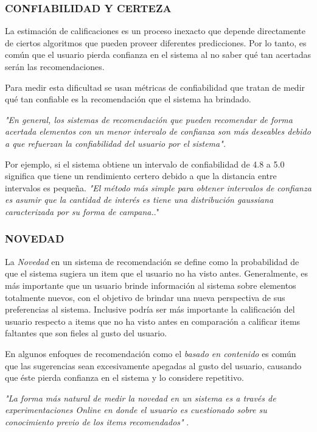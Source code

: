     \subsubsection{CONFIABILIDAD Y CERTEZA }

    La estimación de calificaciones es un proceso inexacto que depende directamente de ciertos algoritmos que pueden proveer diferentes predicciones. Por lo tanto, es común que el usuario pierda confianza en el sistema al no saber qué tan acertadas serán las recomendaciones.

    Para medir esta dificultad se usan métricas de confiabilidad que tratan de medir qué tan confiable es la recomendación que el sistema ha brindado.

    \textit{"En general, los sistemas de recomendación que pueden recomendar de forma acertada elementos con un menor intervalo de confianza son más deseables debido a que refuerzan la confiabilidad del usuario por el sistema".} \parencite{Aggarwal2016}

    Por ejemplo, si el sistema obtiene un intervalo de confiabilidad de 4.8 a 5.0 significa que tiene un rendimiento certero debido a que la distancia entre intervalos es pequeña. \textit{"El método más simple para obtener intervalos de confianza es asumir que la cantidad de interés es tiene una distribución gaussiana  caracterizada por su forma de campana.}." \parencite{10.5555/1941884}

    \subsubsection{NOVEDAD}

    La \textit{Novedad} en un sistema de recomendación se define como la probabilidad de que el sistema sugiera un item que el usuario no ha visto antes.
    Generalmente, es más importante que un usuario brinde información al sistema sobre elementos totalmente nuevos, con el objetivo de brindar una nueva perspectiva de sus preferencias al sistema. Inclusive podría ser más importante la calificación del usuario respecto a items que no ha visto antes en comparación a calificar items faltantes que son fieles al gusto del usuario. 

    En algunos enfoques de recomendación como el \textit{basado en contenido} es común que las sugerencias sean excesivamente apegadas al gusto del usuario, causando que éste pierda confianza en el sistema y lo considere repetitivo.

    \textit{"La forma más natural de medir la novedad en un sistema es a través de experimentaciones Online en donde el usuario es cuestionado sobre su conocimiento previo de los items recomendados"} \parencite{Aggarwal2016}.

